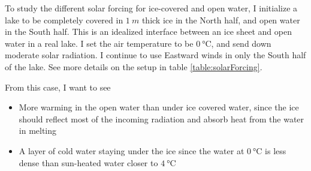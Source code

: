 \documentclass[11pt]{article}
\begin{document}
To study the different solar forcing for ice-covered and open water, I initialize a lake to be completely covered in $\SI{1}{m}$ thick ice in the North half, and open water in the South half. This is an idealized interface between an ice sheet and open water in a real lake. I set the air temperature to be $\SI{0}{\celsius}$, and send down moderate solar radiation. I continue to use Eastward winds in only the South half of the lake. See more details on the setup in table \ref{table:solarForcing}.

From this case, I want to see
\begin{itemize}
\item{More warming in the open water than under ice covered water, since the ice should reflect most of the incoming radiation and absorb heat from the water in melting}
\item{A layer of cold water staying under the ice since the water at $\SI{0}{\celsius}$ is less dense than sun-heated water closer to $\SI{4}{\celsius}$}
\end{itemize}
\end{document}
